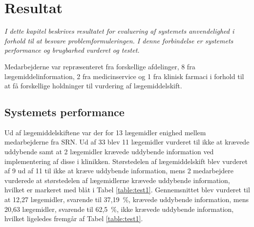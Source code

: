 \chapter{Resultat}
\textit{I dette kapitel beskrives resultatet for evaluering af systemets anvendelighed i forhold til at besvare problemformuleringen. I denne forbindelse er systemets performance og brugbarhed vurderet og testet.}


Medarbejderne var repræsenteret fra forskellige afdelinger, 8 fra lægemiddelinformation, 2 fra medicinservice og 1 fra klinisk farmaci i forhold til at få forskellige holdninger til vurdering af lægemiddelskift. 
 

\section{Systemets performance}
Ud af lægemiddelskiftene var der for 13 lægemidler enighed mellem medarbejderne fra SRN. Ud af 33 blev 11 lægemidler vurderet til ikke at krævede uddybende samt at 2 lægemidler krævede uddybende information ved implementering af disse i klinikken. Størstedelen af lægemiddelskift blev vurderet af 9 ud af 11 til ikke at kræve uddybende information, mens 2 medarbejdere vurderede at størstedelen af lægemidlerne krævede uddybende information, hvilket er markeret med blåt i Tabel \ref{table:test1}. Gennemsnittet blev vurderet til at 12,27 lægemidler, svarende til 37,19~\%, krævede uddybende information, mens 20,63 lægemidler, svarende til 62,5~\%, ikke krævede uddybende information, hvilket ligeledes fremgår af Tabel \ref{table:test1}. 

